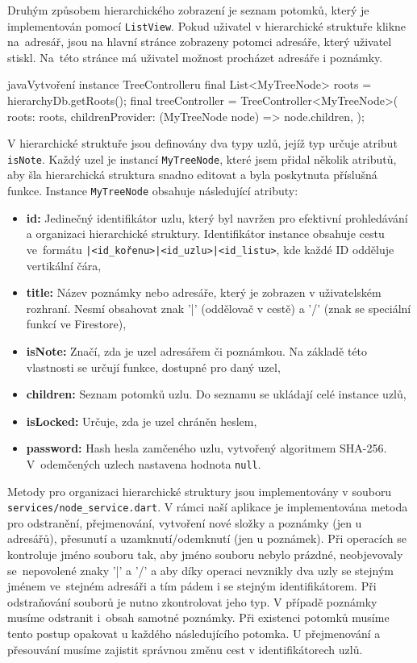 \documentclass[czech, bc, kiv, he, iso690numb]{fasthesis}
\begin{document}
Druhým způsobem hierarchického zobrazení je seznam potomků, který je implementován pomocí \texttt{ListView}. Pokud uživatel v hierarchické struktuře klikne na~adresář, jsou na hlavní stránce zobrazeny potomci adresáře, který uživatel stiskl. Na~této stránce má uživatel možnost procházet adresáře i poznámky.

\begin{code}{java}{Vytvoření instance TreeControlleru \label{code:treeController}}
final List<MyTreeNode> roots = hierarchyDb.getRoots();
final treeController = TreeController<MyTreeNode>(
  roots: roots,
  childrenProvider: (MyTreeNode node) => node.children,
);
\end{code}

V hierarchické struktuře jsou definovány dva typy uzlů, jejíž typ určuje atribut \texttt{isNote}. Každý uzel je instancí \texttt{MyTreeNode}, které jsem přidal několik atributů, aby šla hierarchická struktura snadno editovat a byla poskytnuta příslušná funkce. Instance \texttt{MyTreeNode} obsahuje následující atributy:

\begin{itemize}
    \itemsep0em 
    \item \textbf{id:} Jedinečný identifikátor uzlu, který byl navržen pro efektivní prohledávání a organizaci hierarchické struktury. Identifikátor instance obsahuje cestu ve~formátu \texttt{|<id\_kořenu>|<id\_uzlu>|<id\_listu>}, kde každé ID odděluje vertikální čára,
    \item \textbf{title:} Název poznámky nebo adresáře, který je zobrazen v uživatelském rozhraní. Nesmí obsahovat znak '|' (oddělovač v cestě) a '/' (znak se speciální funkcí ve Firestore),
    \item \textbf{isNote:} Značí, zda je uzel adresářem či poznámkou. Na základě této vlastnosti se určují funkce, dostupné pro daný uzel,
    \item \textbf{children:} Seznam potomků uzlu. Do seznamu se ukládají celé instance uzlů,
    \item \textbf{isLocked:} Určuje, zda je uzel chráněn heslem, 
    \item \textbf{password:} Hash hesla zamčeného uzlu, vytvořený algoritmem \gls{SHA}-256. V~odemčených uzlech nastavena hodnota \texttt{null}. 
\end{itemize}


Metody pro organizaci hierarchické struktury jsou implementovány v souboru \texttt{services/node\_service.dart}. V rámci naší aplikace je implementována metoda pro odstranění, přejmenování, vytvoření nové složky a poznámky (jen u adresářů), přesunutí a uzamknutí/odemknutí (jen u poznámek). Při operacích se kontroluje jméno souboru tak, aby jméno souboru nebylo prázdné, neobjevovaly se~nepovolené znaky '|' a '/' a aby díky operaci nevznikly dva uzly se stejným jménem ve~stejném adresáři a tím pádem i se stejným identifikátorem. Při odstraňování souborů je nutno zkontrolovat jeho typ. V případě poznámky musíme odstranit i~obsah samotné poznámky. Při existenci potomků musíme tento postup opakovat u každého následujícího potomka. U přejmenování a přesouvání musíme zajistit správnou změnu cest v identifikátorech uzlů.
\end{document}

